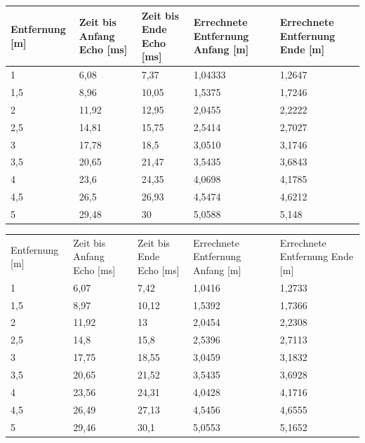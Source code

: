\begin{minipage}{1\textwidth}
\label{tab:Entfernungsmessung15V}
\begin{tabularx}{\textwidth}{|p{}|p{}|p{}|p{}|X|}
\hline
Entfernung [m]& Zeit bis Anfang Echo [ms] & Zeit bis Ende Echo [ms] & Errechnete Entfernung Anfang [m] & Errechnete Entfernung Ende [m]\\
\hline
1 & 6,08 & 7,37 & 1,04333 & 1,2647\\
\hline
1,5 & 8,96 & 10,05 & 1,5375 & 1,7246\\
\hline
2 & 11,92 & 12,95 & 2,0455 & 2,2222\\
\hline
2,5 & 14,81 & 15,75 & 2,5414 & 2,7027\\
\hline
3 & 17,78 & 18,5 & 3,0510 & 3,1746\\
\hline
3,5 & 20,65 & 21,47 & 3,5435 & 3,6843\\
\hline
4 & 23,6 & 24,35 & 4,0698 & 4,1785\\
\hline
4,5 & 26,5 & 26,93 & 4,5474 & 4,6212\\
\hline
5 & 29,48 & 30 & 5,0588 & 5,148\\
\hline
\end{tabularx}
\end{minipage}
\begin{minipage}{1\textwidth}
\label{tab:Entfernungsmessung20V}
\begin{tabularx}{\textwidth}{|p{}|p{}|p{}|p{}|X|}
\hline
Entfernung [m]& Zeit bis Anfang Echo [ms] & Zeit bis Ende Echo [ms] & Errechnete Entfernung Anfang [m] & Errechnete Entfernung Ende [m]\\
1 & 6,07 & 7,42 & 1,0416 & 1,2733\\
\hline
1,5 & 8,97 & 10,12 & 1,5392 & 1,7366\\
\hline
2 & 11,92 & 13 & 2,0454 & 2,2308\\
\hline
2,5 & 14,8 & 15,8 & 2,5396 & 2,7113\\
\hline
3 & 17,75 & 18,55 & 3,0459 & 3,1832\\
\hline
3,5 & 20,65 & 21,52 & 3,5435 & 3,6928\\
\hline
4 & 23,56 & 24,31 & 4,0428 & 4,1716\\
\hline
4,5 & 26,49 & 27,13 & 4,5456 & 4,6555\\
\hline
5 & 29,46 & 30,1 & 5,0553 & 5,1652\\
\hline
\end{tabularx}
\end{minipage}\\

